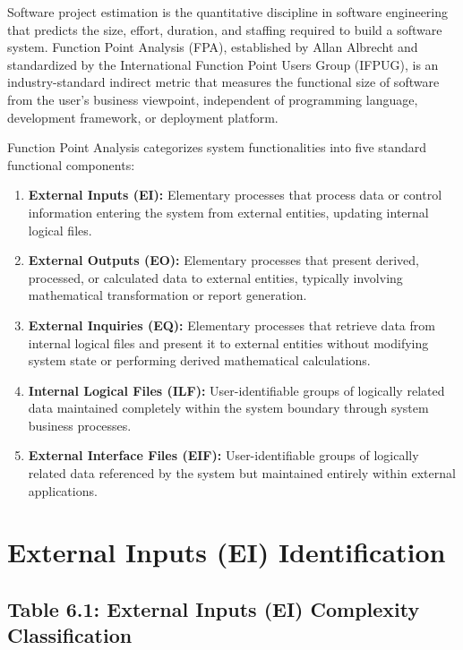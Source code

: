 \documentclass[12pt,a4paper,oneside]{report}
\begin{document}
Software project estimation is the quantitative discipline in software engineering that predicts the size, effort, duration, and staffing required to build a software system. Function Point Analysis (FPA), established by Allan Albrecht and standardized by the International Function Point Users Group (IFPUG), is an industry-standard indirect metric that measures the functional size of software from the user's business viewpoint, independent of programming language, development framework, or deployment platform.

Function Point Analysis categorizes system functionalities into five standard functional components:

\begin{enumerate}
  \item \textbf{External Inputs (EI):} Elementary processes that process data or control information entering the system from external entities, updating internal logical files.
  \item \textbf{External Outputs (EO):} Elementary processes that present derived, processed, or calculated data to external entities, typically involving mathematical transformation or report generation.
  \item \textbf{External Inquiries (EQ):} Elementary processes that retrieve data from internal logical files and present it to external entities without modifying system state or performing derived mathematical calculations.
  \item \textbf{Internal Logical Files (ILF):} User-identifiable groups of logically related data maintained completely within the system boundary through system business processes.
  \item \textbf{External Interface Files (EIF):} User-identifiable groups of logically related data referenced by the system but maintained entirely within external applications.
\end{enumerate}

\section{External Inputs (EI) Identification}

\subsection{Table 6.1: External Inputs (EI) Complexity Classification}
\end{document}
